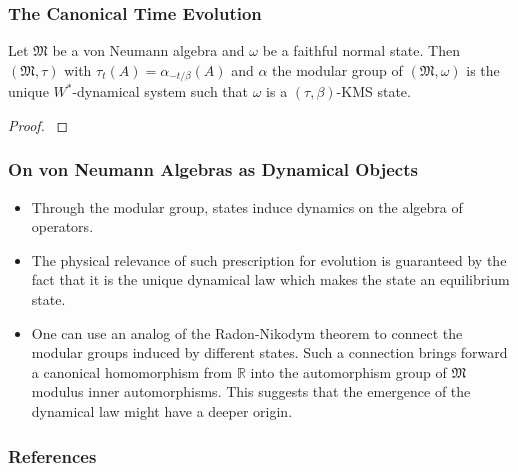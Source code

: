 \documentclass{beamer}
\begin{document}
\begin{frame}
	\frametitle{The Canonical Time Evolution}
	\begin{theorem}[$\bigstar\bigstar\bigstar$]
		Let $\mathfrak{M}$ be a von Neumann algebra and $\omega$ be a faithful normal state. Then $(\mathfrak{M},\tau)$ with $\tau_t(A) = \alpha_{-t/\beta}(A)$ and $\alpha$ the modular group of $(\mathfrak{M},\omega)$ is the unique $W^*$-dynamical system such that $\omega$ is a $(\tau,\beta)$-KMS state.
	\end{theorem}
	\begin{proof}
		\cite{Duvenhage1999}
	\end{proof}
\end{frame}

\begin{frame}
	\frametitle{On von Neumann Algebras as Dynamical Objects}
	\begin{itemize}
		\item Through the modular group, states induce dynamics on the algebra of operators.
		\item The physical relevance of such prescription for evolution is guaranteed by the fact that it is the unique  dynamical law which makes the state an equilibrium state.
		\item One can use an analog of the Radon-Nikodym theorem to connect the modular groups induced by different states. Such a connection brings forward a canonical  homomorphism from $\mathbb{R}$ into the automorphism group of $\mathfrak{M}$ modulus inner automorphisms. This suggests that the emergence of the dynamical law might have a deeper origin.  
	\end{itemize}
\end{frame}

\begin{frame}[allowframebreaks]
	\frametitle{References}
	
	
\end{frame}
\end{document}

